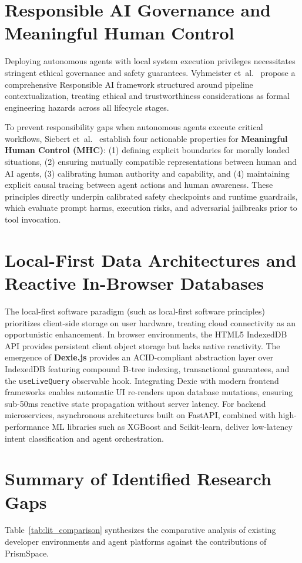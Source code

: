 \documentclass[12pt,a4paper]{report}
\begin{document}
\section{Responsible AI Governance and Meaningful Human Control}
Deploying autonomous agents with local system execution privileges necessitates stringent ethical governance and safety guarantees. Vyhmeister et~al.~\cite{ref_vyhmeister2023_responsibleai} propose a comprehensive Responsible AI framework structured around pipeline contextualization, treating ethical and trustworthiness considerations as formal engineering hazards across all lifecycle stages.

To prevent responsibility gaps when autonomous agents execute critical workflows, Siebert et~al.~\cite{ref_siebert2023_humancontrol} establish four actionable properties for \textbf{Meaningful Human Control (MHC)}: (1) defining explicit boundaries for morally loaded situations, (2) ensuring mutually compatible representations between human and AI agents, (3) calibrating human authority and capability, and (4) maintaining explicit causal tracing between agent actions and human awareness. These principles directly underpin calibrated safety checkpoints and runtime guardrails, which evaluate prompt harms, execution risks, and adversarial jailbreaks prior to tool invocation.

\section{Local-First Data Architectures and Reactive In-Browser Databases}
The local-first software paradigm (such as local-first software principles) prioritizes client-side storage on user hardware, treating cloud connectivity as an opportunistic enhancement. In browser environments, the HTML5 IndexedDB API provides persistent client object storage but lacks native reactivity. The emergence of \textbf{Dexie.js} provides an ACID-compliant abstraction layer over IndexedDB featuring compound B-tree indexing, transactional guarantees, and the \texttt{useLiveQuery} observable hook. Integrating Dexie with modern frontend frameworks enables automatic UI re-renders upon database mutations, ensuring sub-50ms reactive state propagation without server latency. For backend microservices, asynchronous architectures built on FastAPI, combined with high-performance ML libraries such as XGBoost and Scikit-learn, deliver low-latency intent classification and agent orchestration.

\section{Summary of Identified Research Gaps}
Table~\ref{tab:lit_comparison} synthesizes the comparative analysis of existing developer environments and agent platforms against the contributions of PrismSpace.
\end{document}
